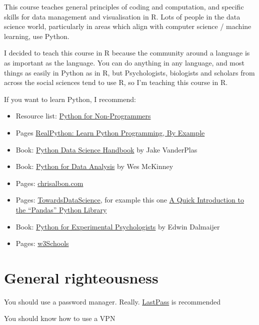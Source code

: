 \documentclass[]{book}
\providecommand{\tightlist}{%
  \setlength{\itemsep}{0pt}\setlength{\parskip}{0pt}}
\begin{document}
This course teaches general principles of coding and computation, and
specific skills for data management and visualisation in R. Lots of
people in the data science world, particularly in areas which align with
computer science / machine learning, use Python.

I decided to teach this course in R because the community around a
language is as important as the language. You can do anything in any
language, and most things as easily in Python as in R, but
Psychologists, biologists and scholars from across the social sciences
tend to use R, so I'm teaching this course in R.

If you want to learn Python, I recommend:

\begin{itemize}
\tightlist
\item
  Resource list:
  \href{https://wiki.python.org/moin/BeginnersGuide/NonProgrammers}{Python
  for Non-Programmers}
\item
  Pages \href{https://realpython.com/start-here/}{RealPython: Learn
  Python Programming, By Example}
\item
  Book:
  \href{https://jakevdp.github.io/PythonDataScienceHandbook/}{Python
  Data Science Handbook} by Jake VanderPlas
\item
  Book: \href{https://wesmckinney.com/pages/book.html}{Python for Data
  Analysis} by Wes McKinney
\item
  Pages: \href{https://chrisalbon.com/}{chrisalbon.com}
\item
  Pages: \href{https://towardsdatascience.com}{TowardsDataScience}, for
  example this one
  \href{https://towardsdatascience.com/a-quick-introduction-to-the-pandas-python-library-f1b678f34673}{A
  Quick Introduction to the ``Pandas'' Python Library}
\item
  Book: \href{http://www.pygaze.org/pep/}{Python for Experimental
  Psychologists} by Edwin Dalmaijer
\item
  Pages: \href{https://www.w3schools.com/python/default.asp}{w3Schools}
\end{itemize}

\section{General righteousness}\label{general-righteousness}

You should use a password manager. Really.
\href{https://www.lastpass.com}{LastPass} is recommended

You should know how to use a VPN
\end{document}
